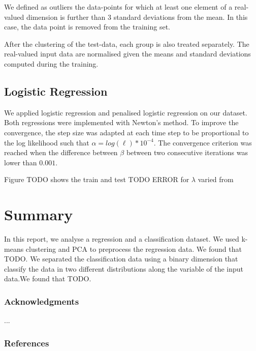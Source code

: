\documentclass{article} %
\begin{document}
We defined as outliers the data-points for which at least one element of a real-valued dimension is further than 3 standard deviations from the mean. In this case, the data point is removed from the training set. 

After the clustering of the test-data, each group is also treated separately. The real-valued input data are normalised given the means and standard deviations computed during the training.

\subsection{Logistic Regression}
We applied logistic regression and penalised logistic regression on our dataset. Both regressions were implemented with Newton's method. To improve the convergence, the step size was adapted at each time step to be proportional to the log likelihood such that $\alpha = log(\ell) * 10^{-4}$. The convergence criterion was reached when the difference between $\beta$ between two consecutive iterations was lower than $0.001$.

Figure TODO shows the train and test TODO ERROR for $\lambda$ varied from

\section{Summary}
In this report, we analyse a regression and a classification dataset. We used k-means clustering and PCA to preprocess the regression data. We found that TODO.
We separated the classification data using a binary dimension that classify the data in two different distributions along the variable of the input data.We found that TODO.


\subsubsection*{Acknowledgments}
...

\subsubsection*{References}
\end{document}
